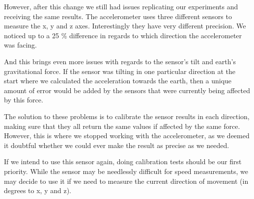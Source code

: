 However, after this change we still had issues replicating our experiments and receiving the same results. The accelerometer uses three different sensors to measure the x, y and z axes. Interestingly they have very different precision. We noticed up to a 25 \% difference in regards to which direction the accelerometer was facing. 

And this brings even more issues with regards to the sensor's tilt and earth's gravitational force. If the sensor was tilting in one particular direction at the start where we calculated the acceleration towards the earth, then a unique amount of error would be added by the sensors that were currently being affected by this force. 

The solution to these problems is to calibrate the sensor results in each direction, making sure that they all return the same values if affected by the same force. However, this is where we stopped working with the accelerometer, as we deemed it doubtful whether we could ever make the result as precise as we needed.

If we intend to use this sensor again, doing calibration tests should be our first priority. While the sensor may be needlessly difficult for speed measurements, we may decide to use it if we need to measure the current direction of movement (in degrees to x, y and z). 



